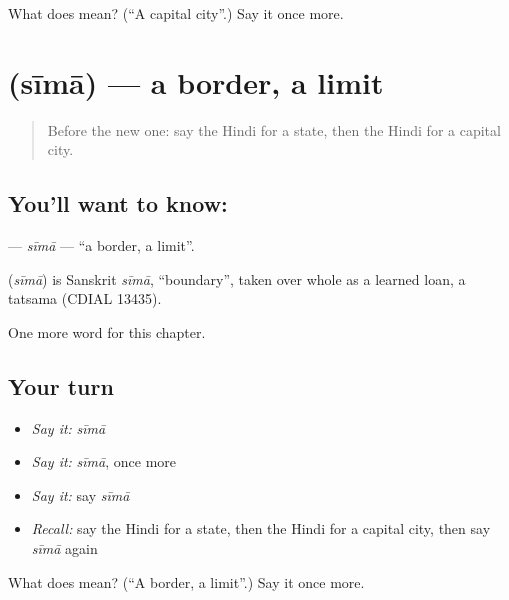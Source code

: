 \begin{tcolorbox}[breakable,colback=teal!4,colframe=teal!35!black,title={Before you move on}]
What does  mean? (\textquotedblleft{}A capital city\textquotedblright{}.) Say it once more.
\end{tcolorbox}
\section[\texorpdfstring{\hi{सीमा} (sīmā)}{सीमा (sīmā)}]{ (sīmā) — a border, a limit}

\label{lesson:HI-C200-sima}



\begin{quote}
Before the new one: say the Hindi for a state, then the Hindi for a capital city.
\end{quote}

\subsection*{You'll want to know: }
\textbf{} — \emph{sīmā} — \textquotedblleft{}a border, a limit\textquotedblright{}.

\begin{cousinweb}
\textbf{} (\emph{sīmā}) is Sanskrit \emph{sīmā}, \textquotedblleft{}boundary\textquotedblright{}, taken over whole as a learned loan, a tatsama (CDIAL 13435).
\end{cousinweb}

\begin{grammarlens}[title={What you've built}]
One more word for this chapter.
\end{grammarlens}

\subsection*{Your turn}
\begin{itemize}
\raggedright
  \item \emph{Say it:} \emph{sīmā}
  \item \emph{Say it:} \emph{sīmā}, once more
  \item \emph{Say it:} say \emph{sīmā}
  \item \emph{Recall:} say the Hindi for a state, then the Hindi for a capital city, then say \emph{sīmā} again
\end{itemize}

\begin{tcolorbox}[breakable,colback=teal!4,colframe=teal!35!black,title={Before you move on}]
What does  mean? (\textquotedblleft{}A border, a limit\textquotedblright{}.) Say it once more.
\end{tcolorbox}
